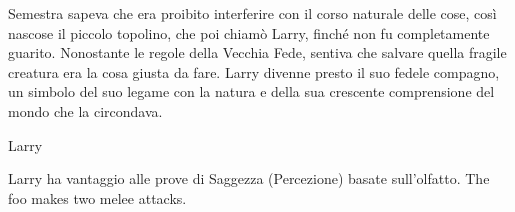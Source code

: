 \documentclass[letterpaper,twocolumn,openany,nodeprecatedcode]{dndbook}
\begin{document}
Semestra sapeva che era proibito interferire con il corso naturale delle cose, così nascose il piccolo topolino, che poi chiamò Larry, finché non fu completamente guarito. Nonostante le regole della Vecchia Fede, sentiva che salvare quella fragile creatura era la cosa giusta da fare. Larry divenne presto il suo fedele compagno, un simbolo del suo legame con la natura e della sua crescente comprensione del mondo che la circondava.
\begin{DndMonster}[float*=b,width=\textwidth + 8pt]{Larry}
  \begin{multicols}{2}

    \DndMonsterBasics[
        armor-class = {10 (armatura naturale)},
        hit-points  = {1 (\DndDice{1d4 - 1})},
        speed       = {6m},
      ]

    \DndMonsterAbilityScores[
        str = 2,
        dex = 11,
        con = 9,
        int = 10,
        wis = 10,
        cha = 4,
      ]

    \DndMonsterDetails[
        senses = {Scurovisione 9m, Percezione Passiva 10},
        languages = {Comprende il Comune},
        challenge = 0,
      ]
     Larry ha vantaggio alle prove di Saggezza (Percezione) basate sull'olfatto.
    The foo makes two melee attacks.

    \DndMonsterAttack[
      name=Dagger,
      mod=+3,
      dmg=\DndDice{1d4+1},
      dmg-type=piercing,
    ]


\end{multicols}
\end{DndMonster}
\end{document}
